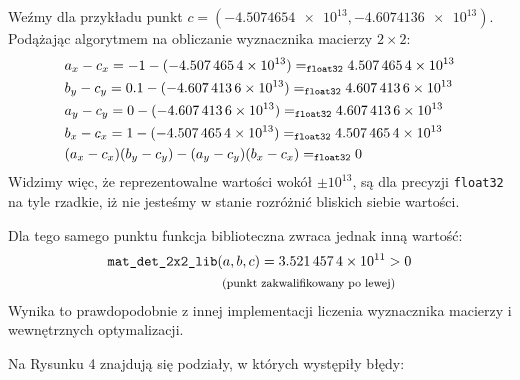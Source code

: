 \documentclass[11pt,a4paper]{article}
\begin{document}
Weźmy dla przykładu punkt $c = (\num{-4.5074654e+13}, \num{-4.6074136e+13})$.
Podążając algorytmem na obliczanie wyznacznika macierzy $2\times2$:
\begin{equation}
\begin{split}
    &a_x - c_x = -1 - (\num{-4.5074654e+13})
    =_{\text{\ttfamily\arraybackslash float32}}
    \num{4.5074654e+13}
    \\
    &b_y - c_y = 0.1 - (\num{-4.6074136e+13})
    =_{\text{\ttfamily\arraybackslash float32}}
    \num{4.6074136e+13}
    \\
    &a_y - c_y = 0 - (\num{-4.6074136e+13})
    =_{\text{\ttfamily\arraybackslash float32}}
    \num{4.6074136e+13}
    \\
    &b_x - c_x = 1 - (\num{-4.5074654e+13})
    =_{\text{\ttfamily\arraybackslash float32}}
    \num{4.5074654e+13}
    \\
    &(a_x - c_x)(b_y - c_y) - (a_y - c_y)(b_x - c_x)
    =_{\text{\ttfamily\arraybackslash float32}}
    0
\end{split}
\end{equation}
Widzimy więc, że reprezentowalne wartości wokół $\pm10^{13}$, 
są dla precyzji \verb|float32| na tyle rzadkie, iż nie jesteśmy
w stanie rozróżnić bliskich siebie wartości.

Dla tego samego punktu funkcja biblioteczna zwraca jednak inną wartość:
\begin{equation}
\begin{split}
    \text{\ttfamily\arraybackslash mat\_det\_2x2\_lib}&(a, b, c) 
    = \num{3.5214574e11} > 0 
    \\
    &\text{ \footnotesize(punkt zakwalifikowany po lewej)}
\end{split}
\end{equation}
Wynika to prawdopodobnie z innej implementacji liczenia wyznacznika macierzy
i wewnętrznych optymalizacji. 

Na Rysunku 4 znajdują się podziały, w których występiły błędy: 
\end{document}
